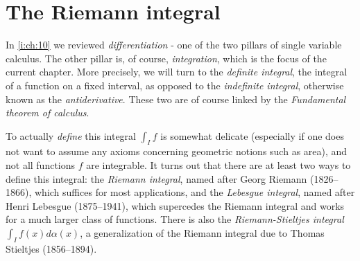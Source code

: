 \chapter{The Riemann integral}\label{i:ch:11}

\begin{note}
  In \cref{i:ch:10} we reviewed \emph{differentiation} - one of the two pillars of single variable calculus.
  The other pillar is, of course, \emph{integration}, which is the focus of the current chapter.
  More precisely, we will turn to the \emph{definite integral}, the integral of a function on a fixed interval, as opposed to the \emph{indefinite integral}, otherwise known as the \emph{antiderivative}.
  These two are of course linked by the \emph{Fundamental theorem of calculus}.
\end{note}

\begin{note}
  To actually \emph{define} this integral \(\int_I f\) is somewhat delicate (especially if one does not want to assume any axioms concerning geometric notions such as area), and not all functions \(f\) are integrable.
  It turns out that there are at least two ways to define this integral:
  the \emph{Riemann integral}, named after Georg Riemann (1826--1866), which suffices for most applications, and the \emph{Lebesgue integral}, named after Henri Lebesgue (1875--1941), which supercedes the Riemann integral and works for a much larger class of functions.
  There is also the \emph{Riemann-Stieltjes integral} \(\int_I f(x) d \alpha(x)\), a generalization of the Riemann integral due to Thomas Stieltjes (1856--1894).
\end{note}












